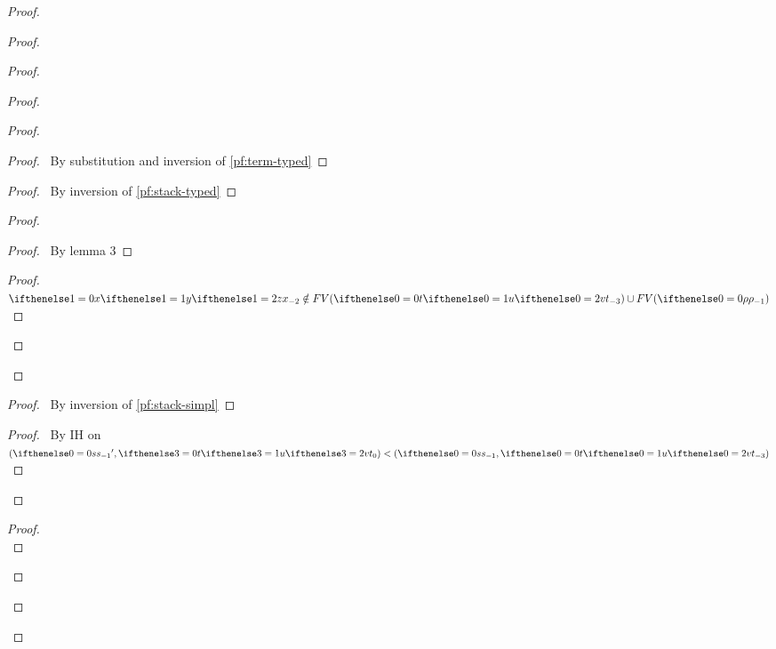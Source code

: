 \documentclass[a4paper]{article}
\begin{document}
\begin{proof}
\begin{proof}
\begin{proof}
\begin{proof}
        \begin{proof}
          \begin{proof}
            \pf\ By substitution and inversion of \ref{pf:term-typed}
          \end{proof}
          \begin{proof}
            \pf\ By inversion of \ref{pf:stack-typed}
          \end{proof}
          \begin{proof}
            \begin{proof}
              \pf\ By lemma 3
            \end{proof}
            \qedstep
            \begin{proof}
              \pf\ $\aVar[1] \notin FV(\aTerm) \cup FV(\env)$
            \end{proof}
          \end{proof}
        \end{proof}
        \begin{proof}
          \pf\ By inversion of \ref{pf:stack-simpl}
        \end{proof}
        \qedstep
        \begin{proof}
          \pf\ By IH on $(\aStack', \aTerm[3]) < (\aStack, \aTerm)$
        \end{proof}
      \end{proof}
      \begin{proof}
        \pf\ \\

\end{proof}
\end{proof}
\end{proof}
\end{proof}
\end{document}
